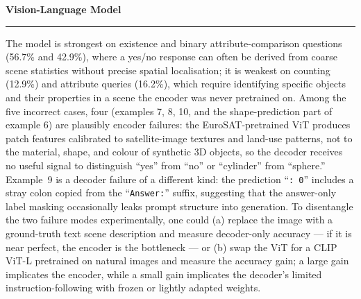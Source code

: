\documentclass[11pt]{article}
\newenvironment{question}[1]
    {
        \begin{center}
        \textbf{#1} \rmfamily
        \bigskip
        \hrule
    }
    {
        \end{center}
    }
\begin{document}
\begin{question}{Vision-Language Model}
\begin{enumerate}[label=(\alph*)]
    The model is strongest on existence and binary attribute-comparison questions (56.7\% and 42.9\%), where a yes/no response can often be derived from coarse scene statistics without precise spatial localisation; it is weakest on counting (12.9\%) and attribute queries (16.2\%), which require identifying specific objects and their properties in a scene the encoder was never pretrained on. Among the five incorrect cases, four (examples 7, 8, 10, and the shape-prediction part of example 6) are plausibly encoder failures: the EuroSAT-pretrained ViT produces patch features calibrated to satellite-image textures and land-use patterns, not to the material, shape, and colour of synthetic 3D objects, so the decoder receives no useful signal to distinguish ``yes'' from ``no'' or ``cylinder'' from ``sphere.'' Example~9 is a decoder failure of a different kind: the prediction ``\texttt{: 0}'' includes a stray colon copied from the ``\texttt{Answer:}'' suffix, suggesting that the answer-only label masking occasionally leaks prompt structure into generation. To disentangle the two failure modes experimentally, one could (a) replace the image with a ground-truth text scene description and measure decoder-only accuracy --- if it is near perfect, the encoder is the bottleneck --- or (b) swap the ViT for a CLIP ViT-L pretrained on natural images and measure the accuracy gain; a large gain implicates the encoder, while a small gain implicates the decoder's limited instruction-following with frozen or lightly adapted weights.

\end{enumerate}
\end{question}
\end{document}
